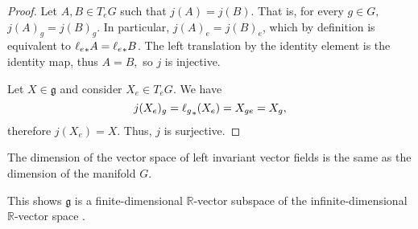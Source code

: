 \begin{proof}
    Let \(A, B \in T_eG\) such that \(j(A) = j(B).\) That is, for every \(g \in G,\) \(j(A)_g = j(B)_g.\) In particular, \(j(A)_e = j(B)_e\), which by definition is equivalent to \({\ell_e}_{\ast{}}A = {\ell_e}_{\ast{}}B\). The left translation by the identity element is the identity map, thus \(A = B,\) so \(j\) is injective.

    Let \(X \in \mathfrak{g}\) and consider \(X_e \in T_eG.\) We have
    \begin{equation*}
        j(X_e)_g = {\ell_g}_{\ast{}}(X_e) = X_{ge} = X_g,
    \end{equation*}
    therefore \(j(X_e) = X.\) Thus, \(j\) is surjective.
\end{proof}

\begin{corollary}
    The dimension of the vector space of left invariant vector fields is the same as the dimension of the manifold \(G\).
\end{corollary}
\begin{remark}
    This shows \(\mathfrak{g}\) is a finite-dimensional \(\mathbb{R}\)-vector subspace of the infinite-dimensional \(\mathbb{R}\)-vector space .
\end{remark}

